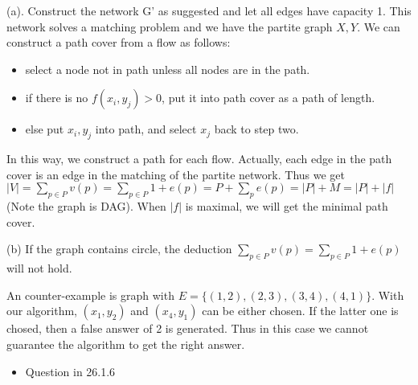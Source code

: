 \begin{cproblem}[26-2]
\end{cproblem}
\begin{csolution}
    (a). Construct the network G' as suggested and let all edges have capacity 1. This network solves a matching problem and we have the partite graph $X,Y$. We can construct a path cover from a flow as follows:
    \begin{itemize}
        \item select a node not in path unless all nodes are in the path.
        \item if there is no $f(x_i,y_j)>0$, put it into path cover as a path of length.
        \item else put $x_i,y_j$ into path, and select $x_j$ back to step two.
    \end{itemize}

    In this way, we construct a path for each flow. Actually, each edge in the path cover is an edge in the matching of the partite network. Thus we get $|V|=\sum_{p\in P}{v(p)}=\sum_{p\in P}{1+e(p)}=P+\sum_{p}{e(p)}=|P|+M=|P|+|f|$(Note the graph is DAG). When $|f|$ is maximal, we will get the minimal path cover.

    (b) If the graph contains circle, the deduction $\sum_{p\in P}{v(p)}=\sum_{p\in P}{1+e(p)}$ will not hold.
    
    An counter-example is graph with $E=\{(1,2),(2,3),(3,4),(4,1)\}$. With our algorithm, $(x_1,y_2)$ and $(x_4,y_1)$ can be either chosen. If the latter one is chosed, then a false answer of 2 is generated. Thus in this case we cannot guarantee the algorithm to get the right answer.
\end{csolution}


\begin{itemize}
    \item Question in 26.1.6
\end{itemize}